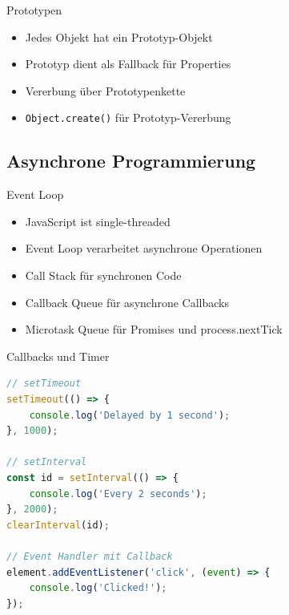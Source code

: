 \begin{concept}{Prototypen}
    \begin{itemize}
        \item Jedes Objekt hat ein Prototyp-Objekt
        \item Prototyp dient als Fallback für Properties
        \item Vererbung über Prototypenkette
        \item \texttt{Object.create()} für Prototyp-Vererbung
    \end{itemize}
\end{concept}

\subsection{Asynchrone Programmierung}

\begin{concept}{Event Loop}
    \begin{itemize}
        \item JavaScript ist single-threaded
        \item Event Loop verarbeitet asynchrone Operationen
        \item Call Stack für synchronen Code
        \item Callback Queue für asynchrone Callbacks
        \item Microtask Queue für Promises und process.nextTick
    \end{itemize}
\end{concept}

\begin{KR}{Callbacks und Timer}
\begin{lstlisting}[language=JavaScript, style=basesmol]
// setTimeout
setTimeout(() => {
    console.log('Delayed by 1 second');
}, 1000);

// setInterval
const id = setInterval(() => {
    console.log('Every 2 seconds');
}, 2000);
clearInterval(id);

// Event Handler mit Callback
element.addEventListener('click', (event) => {
    console.log('Clicked!');
});
\end{lstlisting}
\end{KR}

